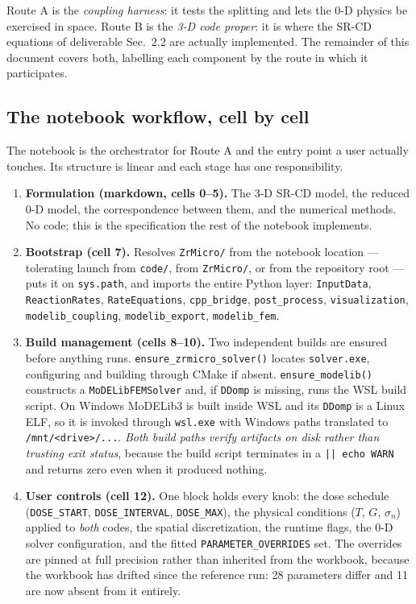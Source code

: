 \documentclass[11pt]{article}
\newcommand{\MoD}{\textsf{MoDELib3}}
\newcommand{\code}[1]{\texttt{\small #1}}
\newcommand{\file}[1]{\texttt{\footnotesize #1}}
\begin{document}
\medskip
\noindent
Route A is the \emph{coupling harness}: it tests the splitting and lets the 0-D
physics be exercised in space. Route B is the \emph{3-D code proper}: it is where
the SR-CD equations of deliverable Sec.~2.2 are actually implemented. The
remainder of this document covers both, labelling each component by the route in
which it participates.

\subsection{The notebook workflow, cell by cell}

The notebook is the orchestrator for Route A and the entry point a user actually
touches. Its structure is linear and each stage has one responsibility.

\begin{enumerate}
\item \textbf{Formulation (markdown, cells 0--5).} The 3-D SR-CD model, the
reduced 0-D model, the correspondence between them, and the numerical methods.
No code; this is the specification the rest of the notebook implements.

\item \textbf{Bootstrap (cell 7).} Resolves \file{ZrMicro/} from the notebook
location --- tolerating launch from \file{code/}, from \file{ZrMicro/}, or from
the repository root --- puts it on \code{sys.path}, and imports the entire Python
layer: \code{InputData}, \code{ReactionRates}, \code{RateEquations},
\code{cpp\_bridge}, \code{post\_process}, \code{visualization},
\code{modelib\_coupling}, \code{modelib\_export}, \code{modelib\_fem}.

\item \textbf{Build management (cells 8--10).} Two independent builds are ensured
before anything runs.
\code{ensure\_zrmicro\_solver()} locates \code{solver.exe}, configuring and
building through CMake if absent.
\code{ensure\_modelib()} constructs a \code{MoDELibFEMSolver} and, if \code{DDomp}
is missing, runs the WSL build script. On Windows \MoD{} is built inside WSL and
its \code{DDomp} is a Linux ELF, so it is invoked through \code{wsl.exe} with
Windows paths translated to \file{/mnt/<drive>/...}.
\emph{Both build paths verify artifacts on disk rather than trusting exit status},
because the build script terminates in a \code{|| echo WARN} and returns zero
even when it produced nothing.

\item \textbf{User controls (cell 12).} One block holds every knob: the dose
schedule (\code{DOSE\_START}, \code{DOSE\_INTERVAL}, \code{DOSE\_MAX}), the
physical conditions ($T$, $G$, $\sigma_n$) applied to \emph{both} codes, the
spatial discretization, the runtime flags, the 0-D solver configuration, and the
fitted \code{PARAMETER\_OVERRIDES} set. The overrides are pinned at full
precision rather than inherited from the workbook, because the workbook has
drifted since the reference run: 28 parameters differ and 11 are now absent
from it entirely.


\end{enumerate}
\end{document}
